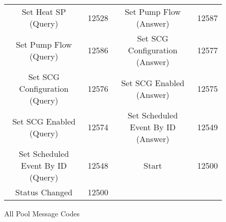 \documentclass[11pt]{article}
\begin{document}
\begin{figure}[!h]
\begin{tabular}{ c | c || c | c}
Set Heat SP (Query) & 12528  & Set Pump Flow (Answer) & 12587 \\ 
Set Pump Flow (Query) & 12586  & Set SCG Configuration (Answer) & 12577 \\ 
Set SCG Configuration (Query) & 12576  & Set SCG Enabled (Answer) & 12575 \\ 
Set SCG Enabled (Query) & 12574  & Set Scheduled Event By ID (Answer) & 12549 \\ 
Set Scheduled Event By ID (Query) & 12548  & Start & 12500 \\ 
Status Changed & 12500  &  &  
\end{tabular}
\normalsize
\caption{All Pool Message Codes}
\label{fig:all_pool_codes}
\end{figure}


\end{document}
